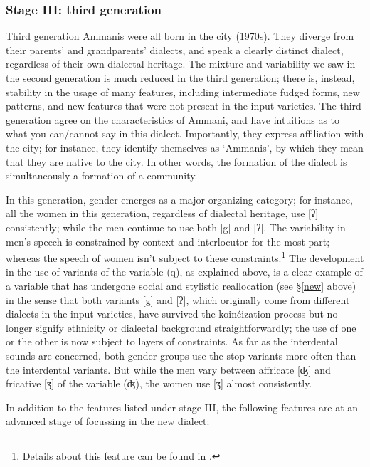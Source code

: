 \documentclass[output=paper]{langsci/langscibook}
\begin{document}
\subsubsection{Stage III: third generation}

Third generation Ammanis were all born in the city (1970s). They diverge from their parents’ and grandparents’ dialects, and speak a clearly distinct dialect, regardless of their own dialectal heritage. The mixture and variability we saw in the second generation is much reduced in the third generation; there is, instead, stability in the usage of many features, including intermediate fudged forms, new patterns, and new features that were not present in the input varieties. The third generation agree on the characteristics of Ammani, and have intuitions as to what you can/cannot say in this dialect. Importantly, they express affiliation with the city; for instance, they identify themselves as ‘Ammanis’, by which they mean that they are native to the city. In other words, the formation of the dialect is simultaneously a formation of a community.

In this generation, gender emerges as a major organizing category; for instance, all the women in this generation, regardless of dialectal heritage, use [ʔ] consistently; while the men continue to use both [g] and [ʔ]. The variability in men’s speech is constrained by context and interlocutor for the most part; whereas the speech of women isn’t subject to these constraints.\footnote{Details about this feature can be found in \citet{Al-WerHerin2011}.} The development in the use of variants of the variable (q), as explained above, is a clear example of a variable that has undergone social and stylistic reallocation (see §\ref{new} above) in the sense that both variants [g] and [ʔ], which originally come from different dialects in the input varieties, have survived the koinéization process but no longer signify ethnicity or dialectal background straightforwardly; the use of one or the other is now subject to layers of constraints. As far as the interdental sounds are concerned, both gender groups use the stop variants more often than the interdental variants. But while the men vary between affricate [ʤ] and fricative [ʒ] of the variable (ʤ), the women use [ʒ] almost consistently.

In addition to the features listed under stage III, the following features are at an advanced stage of focussing in the new dialect:
\end{document}
